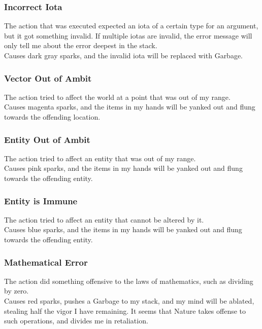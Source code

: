 \documentclass[12pt]{article}
\begin{document}
  \subsubsection*{Incorrect Iota}

    The action that was executed expected an iota of a certain type for an argument, but it got something invalid. If multiple iotas are invalid, the error message will only tell me about the error deepest in the stack.\\Causes dark gray sparks, and the invalid iota will be replaced with Garbage.\\


  \subsubsection*{Vector Out of Ambit}

    The action tried to affect the world at a point that was out of my range.\\Causes magenta sparks, and the items in my hands will be yanked out and flung towards the offending location.\\


  \subsubsection*{Entity Out of Ambit}

    The action tried to affect an entity that was out of my range.\\Causes pink sparks, and the items in my hands will be yanked out and flung towards the offending entity.\\


  \subsubsection*{Entity is Immune}

    The action tried to affect an entity that cannot be altered by it.\\Causes blue sparks, and the items in my hands will be yanked out and flung towards the offending entity.\\


  \subsubsection*{Mathematical Error}

    The action did something offensive to the laws of mathematics, such as dividing by zero.\\Causes red sparks, pushes a Garbage to my stack, and my mind will be ablated, stealing half the vigor I have remaining. It seems that Nature takes offense to such operations, and divides me in retaliation.\\
\end{document}
